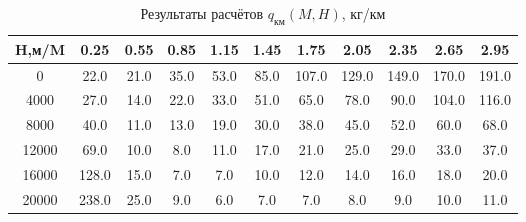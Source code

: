\begin{table}[H]
\centering
\caption{Результаты расчётов $q_\text{км}(M,H)$, кг/км}
\label{nx}
\begin{tabular}{|c|c|c|c|c|c|c|c|c|c|c|}
\toprule
H,м/M &   0.25 &  0.55 &  0.85 &  1.15 &  1.45 &   1.75 &   2.05 &   2.35 &   2.65 &   2.95 \\
\midrule
0     &   22.0 &  21.0 &  35.0 &  53.0 &  85.0 &  107.0 &  129.0 &  149.0 &  170.0 &  191.0 \\
4000  &   27.0 &  14.0 &  22.0 &  33.0 &  51.0 &   65.0 &   78.0 &   90.0 &  104.0 &  116.0 \\
8000  &   40.0 &  11.0 &  13.0 &  19.0 &  30.0 &   38.0 &   45.0 &   52.0 &   60.0 &   68.0 \\
12000 &   69.0 &  10.0 &   8.0 &  11.0 &  17.0 &   21.0 &   25.0 &   29.0 &   33.0 &   37.0 \\
16000 &  128.0 &  15.0 &   7.0 &   7.0 &  10.0 &   12.0 &   14.0 &   16.0 &   18.0 &   20.0 \\
20000 &  238.0 &  25.0 &   9.0 &   6.0 &   7.0 &    7.0 &    8.0 &    9.0 &   10.0 &   11.0 \\
\bottomrule
\end{tabular}
\end{table}
